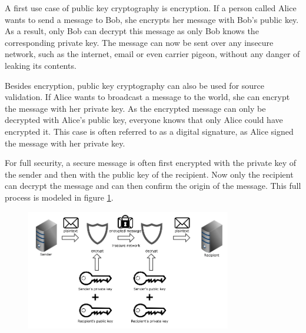 A first use case of public key cryptography is encryption. If a person called Alice wants to send a message to Bob, she encrypts her message with Bob's public key. As a result, only Bob can decrypt this message as only Bob knows the corresponding private key. The message can now be sent over any insecure network, such as the internet, email or even carrier pigeon, without any danger of leaking its contents.

Besides encryption, public key cryptography can also be used for source validation. If Alice wants to broadcast a message to the world, she can encrypt the message with her private key. As the encrypted message can only be decrypted with Alice's public key, everyone knows that only Alice could have encrypted it. This case is often referred to as a digital signature, as Alice signed the message with her private key. 

For full security, a secure message is often first encrypted with the private key of the sender and then with the public key of the recipient. Now only the recipient can decrypt the message and can then confirm the origin of the message. This full process is modeled in figure \ref{fig:rsa-diagram}.

\begin{figure}[h]
\centering
\includegraphics[width=0.8\textwidth]{paper-images/rsa-diagram.png}
\caption{}
\label{fig:rsa-diagram}
\end{figure}

